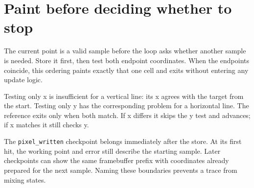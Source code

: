 \section{Paint before deciding whether to
  stop}\label{007-bresenham-line-p06-paint-before-deciding-whether-to-stop}

The current point is a valid sample before the loop asks whether another
sample is needed. Store it first, then test both endpoint coordinates.
When the endpoints coincide, this ordering paints exactly that one cell
and exits without entering any update logic.

Testing only x is insufficient for a vertical line: its x agrees with
the target from the start. Testing only y has the corresponding problem
for a horizontal line. The reference exits only when both match. If x
differs it skips the y test and advances; if x matches it still checks
y.

The \texttt{pixel\_written} checkpoint belongs immediately after the
store. At its first hit, the working point and error still describe the
starting sample. Later checkpoints can show the same framebuffer prefix
with coordinates already prepared for the next sample. Naming these
boundaries prevents a trace from mixing states.
